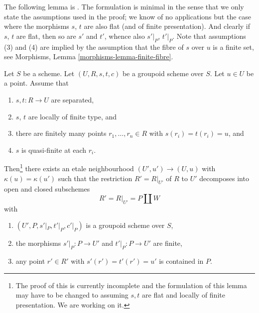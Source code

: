 \noindent
The following lemma is \cite[Proposition 4.2]{K-M}.
The formulation is minimal in the sense that we only state the assumptions
used in the proof; we know of no applications but the case where
the morphisms $s$, $t$ are also flat (and of finite presentation).
And clearly if $s$, $t$ are flat, then so are $s'$ and $t'$, whence
also $s'|_P$, $t'|_P$.
Note that assumptions (3) and (4) are implied by the assumption
that the fibre of $s$ over $u$ is a finite set, see
Morphisms, Lemma \ref{morphisms-lemma-finite-fibre}.

\begin{lemma}
\label{lemma-quasi-finite-groupoid}
Let $S$ be a scheme.
Let $(U, R, s, t, c)$ be a groupoid scheme over $S$.
Let $u \in U$ be a point. Assume that
\begin{enumerate}
\item $s, t : R \to U$ are separated,
\item $s$, $t$ are locally of finite type, and
\item there are finitely many points $r_1, \ldots, r_n \in R$ with
$s(r_i) = t(r_i) = u$, and
\item $s$ is quasi-finite at each $r_i$.
\end{enumerate}
Then\footnote{The proof of this is currently incomplete and the formulation
of this lemma may have to be changed to assuming $s,t$ are flat and locally
of finite presentation. We are working on it.}
there exists an etale neighbourhood $(U', u') \to (U, u)$
with $\kappa(u) = \kappa(u')$
such that the restriction $R' = R|_{U'}$ of $R$ to $U'$ decomposes
into open and closed subschemes
$$
R' = R|_{U'} = P \coprod W
$$
with
\begin{enumerate}
\item $(U', P, s'|_P, t'|_P, c'|_P)$ is a groupoid scheme over $S$,
\item the morphisms $s'|_P : P \to U'$ and $t'|_P : P \to U'$ are
finite,
\item any point $r' \in R'$ with $s'(r') = t'(r') = u'$ is contained
in $P$.
\end{enumerate}
\end{lemma}

